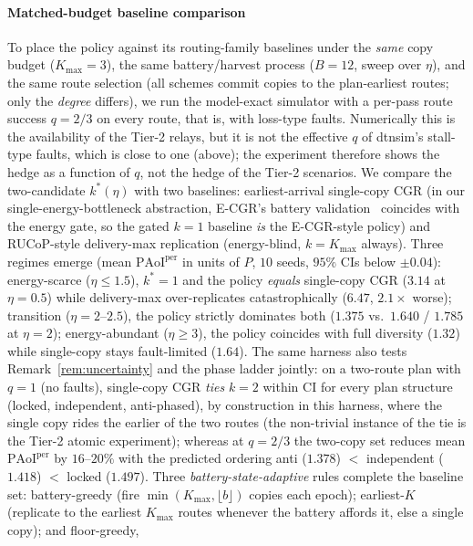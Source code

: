 \documentclass[twocolumn,3p,times,procedia]{elsarticle}
\theoremstyle{plain}
\theoremstyle{remark}
\newcommand{\PAoIper}{\mathrm{PAoI}^{\mathrm{per}}}
\newcommand{\kstar}{k^{\ast}}
\begin{document}
\paragraph*{Matched-budget baseline comparison}
To place the policy against its routing-family baselines under the
\emph{same} copy budget ($K_{\max}{=}3$), the same battery/harvest
process ($B{=}12$, sweep over $\eta$), and the same route selection
(all schemes commit copies to the plan-earliest routes; only the
\emph{degree} differs), we run the model-exact simulator with a
per-pass route success $q{=}2/3$ on every route, that is, with
loss-type faults. Numerically this is the availability of the Tier-2
relays, but it is not the effective $q$ of dtnsim's stall-type faults,
which is close to one (above); the experiment therefore shows the hedge
as a function of $q$, not the hedge of the Tier-2 scenarios. We compare the
two-candidate $\kstar(\eta)$ with two baselines: earliest-arrival
single-copy CGR (in our single-energy-bottleneck
abstraction, E-CGR's battery validation~\cite{ecgr} coincides with the
energy gate, so the gated $k{=}1$ baseline \emph{is} the E-CGR-style
policy) and RUCoP-style delivery-max replication (energy-blind,
$k{=}K_{\max}$ always). Three
regimes emerge (mean $\PAoIper$ in units of $P$, $10$ seeds, $95\%$
CIs below $\pm0.04$): energy-scarce ($\eta\le1.5$), $\kstar{=}1$ and
the policy \emph{equals} single-copy CGR ($3.14$ at $\eta{=}0.5$)
while delivery-max over-replicates catastrophically ($6.47$,
$2.1\times$ worse); transition ($\eta{=}2$--$2.5$), the policy
strictly dominates both ($1.375$ vs.\ $1.640$ / $1.785$ at
$\eta{=}2$); energy-abundant ($\eta\ge3$), the policy coincides with
full diversity ($1.32$) while single-copy stays fault-limited
($1.64$). The same harness also tests Remark~\ref{rem:uncertainty}
and the phase ladder jointly: on a two-route plan with $q{=}1$ (no
faults), single-copy CGR \emph{ties} $k{=}2$ within CI for every plan
structure (locked, independent, anti-phased), by construction in this
harness, where the single copy rides the earlier of the two routes (the
non-trivial instance of the tie is the Tier-2 atomic experiment);
whereas at $q{=}2/3$
the two-copy set reduces mean $\PAoIper$ by $16$--$20\%$ with the
predicted ordering
anti ($1.378$) $<$ independent ($1.418$) $<$ locked ($1.497$).
Three \emph{battery-state-adaptive} rules complete the baseline set:
battery-greedy (fire $\min(K_{\max},\lfloor b\rfloor)$ copies each
epoch); earliest-$K$ (replicate to the earliest $K_{\max}$ routes
whenever the battery affords it, else a single copy); and floor-greedy,
\end{document}
